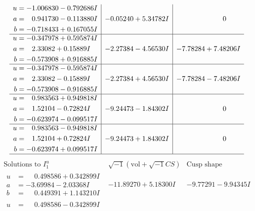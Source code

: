 \documentclass[1p]{elsarticle_modified}
\theoremstyle{definition}
\newcommand{\I}{\sqrt{-1}}
\begin{document}
$$\begin{array}{c|c|c}
\begin{aligned}
u &= -1.006830 - 0.792686 I \\
a &= \phantom{-}0.941730 - 0.113880 I \\
b &= -0.718433 + 0.167055 I\end{aligned}
 & -0.05240 + 5.34782 I & \phantom{-0.000000 } 0 \\ \hline\begin{aligned}
u &= -0.347978 + 0.595874 I \\
a &= \phantom{-}2.33082 + 0.15889 I \\
b &= -0.573908 + 0.916885 I\end{aligned}
 & -2.27384 - 4.56530 I & -7.78284 + 7.48206 I \\ \hline\begin{aligned}
u &= -0.347978 - 0.595874 I \\
a &= \phantom{-}2.33082 - 0.15889 I \\
b &= -0.573908 - 0.916885 I\end{aligned}
 & -2.27384 + 4.56530 I & -7.78284 - 7.48206 I \\ \hline\begin{aligned}
u &= \phantom{-}0.983563 + 0.949818 I \\
a &= \phantom{-}1.52104 - 0.72824 I \\
b &= -0.623974 - 0.099517 I\end{aligned}
 & -9.24473 - 1.84302 I & \phantom{-0.000000 } 0 \\ \hline\begin{aligned}
u &= \phantom{-}0.983563 - 0.949818 I \\
a &= \phantom{-}1.52104 + 0.72824 I \\
b &= -0.623974 + 0.099517 I\end{aligned}
 & -9.24473 + 1.84302 I & \phantom{-0.000000 } 0\\
 \hline 
 \end{array}$$\newpage$$\begin{array}{c|c|c}  
\text{Solutions to }I^u_{1}& \I (\text{vol} + \sqrt{-1}CS) & \text{Cusp shape}\\
 \hline 
\begin{aligned}
u &= \phantom{-}0.498586 + 0.342899 I \\
a &= -3.69984 - 2.03368 I \\
b &= \phantom{-}0.449391 + 1.143210 I\end{aligned}
 & -11.89270 + 5.18300 I & -9.77291 - 9.94345 I \\ \hline\begin{aligned}
u &= \phantom{-}0.498586 - 0.342899 I \\

\end{aligned}
\end{array}$$
\end{document}

